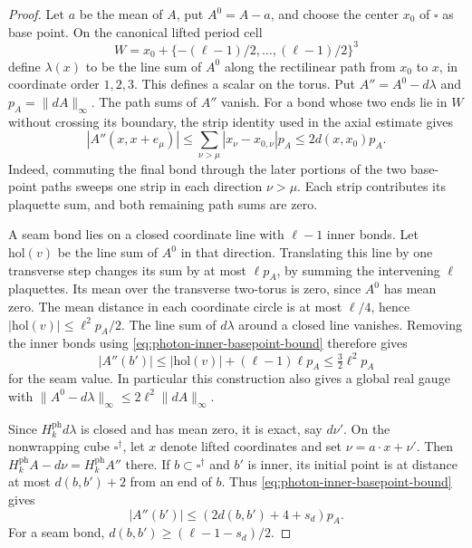 \documentclass[11pt,letterpaper,reqno]{amsart}
\begin{document}
\begin{proof}
Let $a$ be the mean of $A$, put $A^0=A-a$, and choose the center
$x_0$ of $\square$ as base point. On the canonical lifted period
cell
\[
 W=x_0+\{-(\ell-1)/2,\ldots,(\ell-1)/2\}^3
\]
define $\lambda(x)$ to be the line sum of $A^0$ along the
rectilinear path from $x_0$ to $x$, in coordinate order $1,2,3$.
This defines a scalar on the torus. Put $A''=A^0-d\lambda$ and
$p_A=\|dA\|_\infty$. The path sums of $A''$ vanish. For a bond
whose two ends lie in $W$ without crossing its boundary,
the strip identity used in the axial estimate gives
\begin{equation}\label{eq:photon-inner-basepoint-bound}
 |A''(x,x+e_\mu)|\le\sum_{\nu>\mu}|x_\nu-x_{0,\nu}|p_A
                                      \le2d(x,x_0)p_A.
\end{equation}
Indeed, commuting the final bond through the later portions of
the two base-point paths sweeps one strip in each direction
$\nu>\mu$. Each strip contributes its plaquette sum, and both
remaining path sums are zero.

A seam bond lies on a closed coordinate line with $\ell-1$
inner bonds. Let $\mathrm{hol}(v)$ be the line sum of $A^0$ in
that direction. Translating this line by one transverse step
changes its sum by at most $\ell p_A$, by summing the intervening
$\ell$ plaquettes. Its mean over the transverse two-torus is zero,
since $A^0$ has mean zero. The mean distance in each coordinate
circle is at most $\ell/4$, hence
$|\mathrm{hol}(v)|\le\ell^2p_A/2$. The line sum of $d\lambda$
around a closed line vanishes. Removing the inner bonds using
\eqref{eq:photon-inner-basepoint-bound} therefore gives
\begin{equation}\label{eq:photon-seam-basepoint-bound}
 |A''(b')|\le|\mathrm{hol}(v)|+(\ell-1)\ell p_A
                                  \le\tfrac32\ell^2p_A
\end{equation}
for the seam value. In particular this construction also gives a
global real gauge with
$\|A^0-d\lambda\|_\infty\le2\ell^2\|dA\|_\infty$.

Since $H_k^{\mathrm{ph}}d\lambda$ is closed and has mean zero,
it is exact, say $d\nu'$. On the nonwrapping cube
$\square^\dagger$, let $x$ denote lifted coordinates and set
$\nu=a\cdot x+\nu'$. Then
$H_k^{\mathrm{ph}}A-d\nu=H_k^{\mathrm{ph}}A''$ there.
If $b\subset\square^\dagger$ and $b'$ is inner, its initial
point is at distance at most $d(b,b')+2$ from an end of $b$.
Thus \eqref{eq:photon-inner-basepoint-bound} gives
\[
 |A''(b')|\le(2d(b,b')+4+s_d)p_A.
\]
For a seam bond,
$d(b,b')\ge(\ell-1-s_d)/2$.


\end{proof}
\end{document}

